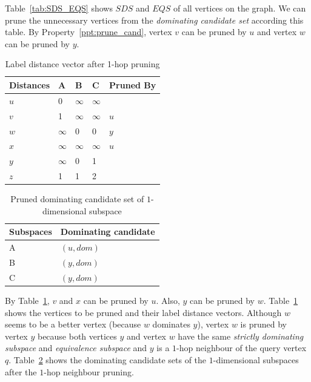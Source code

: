 Table~\ref{tab:SDS_EQS} shows $SDS$ and $EQS$ of all vertices on the graph. We can prune the unnecessary vertices from the \emph{dominating candidate set} according this table. By Property~\ref{ppt:prune_cand}, vertex $v$ can be pruned by $u$ and vertex $w$ can be pruned by $y$.

\begin{table}[h]
    \centering
    \begin{tabular}{lllll}
    \hline
    Distances & A & B & C & Pruned By\\ \hline
    $u$       & 0 & $\infty$ & $\infty$ &\\ \hline
    $v$       & 1 & $\infty$ & $\infty$ & $u$\\ \hline
    $w$       & $\infty$ & 0 & 0 & $y$\\ \hline
    $x$       & $\infty$ & $\infty$ & $\infty$ & $u$\\ \hline
    $y$       & $\infty$ & 0 & 1 & \\ \hline
    $z$       & 1 & 1 & 2 &\\ \hline
    \end{tabular}
    \caption{Label distance vector after 1-hop pruning}
    \label{tab:lv_pruned}
\end{table}

\begin{table}[h]
    \centering
    \begin{tabular}{|l|l|}
    \hline
    Subspaces & Dominating candidate \\ \hline
    A         & $(u, dom)$            \\ \hline
    B         & $(y, dom)$            \\ \hline
    C         & $(y, dom)$            \\ \hline
    \end{tabular}
    \caption{Pruned dominating candidate set of $1$-dimensional subspace}
    \label{tab:dom_cand_pruned}
\end{table}

By Table~\ref{tab:lv_pruned}, $v$ and $x$ can be pruned by $u$. Also, $y$ can be pruned by $w$. Table~\ref{tab:lv_pruned} shows the vertices to be pruned and their label distance vectors. Although $w$ seems to be a better vertex (because $w$ dominates $y$), vertex $w$ is pruned by vertex $y$ because both vertices $y$ and vertex $w$ have the same \emph{strictly dominating subspace} and \emph{equivalence subspace} and $y$ is a $1$-hop neighbour of the query vertex $q$. Table~\ref{tab:dom_cand_pruned} shows the dominating candidate sets of the $1$-dimensional subspaces after the $1$-hop neighbour pruning.

